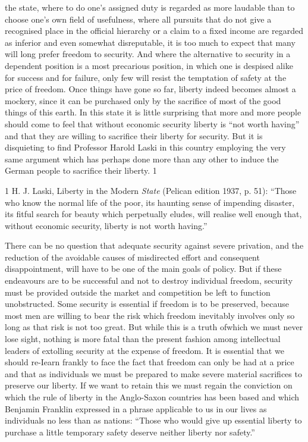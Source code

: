 \documentclass[11pt,openany]{book}
\begin{document}
the state, where to do one's assigned duty is regarded as more laudable than to choose one's own field of usefulness, where all pursuits that do not give a recognised place in the official hierarchy or a claim to a fixed income are regarded as inferior and even somewhat disreputable, it is too much to expect that many will long prefer freedom to security. And where the alternative to security in a dependent position is a most precarious position, in which one is despised alike for success and for failure, only few will resist the temptation of safety at the price of freedom. Once things have gone so far, liberty indeed becomes almost a mockery, since it can be purchased only by the sacrifice of most of the good things of this earth. In this state it is little surprising that more and more people should come to feel that without economic security liberty is ``not worth having'' and that they are willing to sacrifice their liberty for security. But it is disquieting to find Professor Harold Laski in this country employing the very same argument which has perhaps done more than any other to induce the German people to sacrifice their liberty. 1

1 H. J. Laski, Liberty in the Modern \emph{State} (Pelican edition 1937, p. 51): ``Those who know the normal life of the poor, its haunting sense of impending disaster, its fitful search for beauty which perpetually eludes, will realise well enough that, without economic security, liberty is not worth having.''

There can be no question that adequate security against severe privation, and the reduction of the avoidable causes of misdirected effort and consequent disappointment, will have to be one of the main goals of policy. But if these endeavours are to be successful and not to destroy individual freedom, security must be provided outside the market and competition be left to function unobstructed. Some security is essential if freedom is to be preserved, because most men are willing to bear the risk which freedom inevitably involves only so long as that risk is not too great. But while this is a truth ofwhich we must never lose sight, nothing is more fatal than the present fashion among intellectual leaders of extolling security at the expense of freedom. It is essential that we should re-Iearn frankly to face the fact that freedom can only be had at a price and that as individuals we must be prepared to make severe material sacrifices to preserve our liberty. If we want to retain this we must regain the conviction on which the rule of liberty in the Anglo-Saxon countries has been based and which Benjamin Franklin expressed in a phrase applicable to us in our lives as individuals no less than as nations: ``Those who would give up essential liberty to purchase a little temporary safety deserve neither liberty nor safety.''
\end{document}
